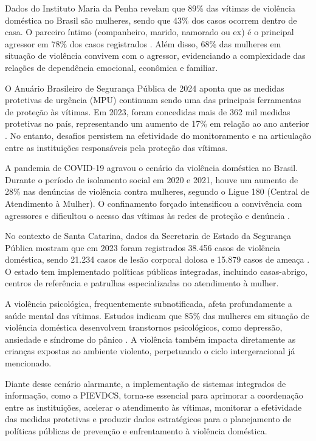 \par Dados do Instituto Maria da Penha revelam que 89\% das vítimas de violência doméstica no Brasil são mulheres, sendo que 43\% dos casos ocorrem dentro de casa. O parceiro íntimo (companheiro, marido, namorado ou ex) é o principal agressor em 78\% dos casos registrados \cite{imp2023}. Além disso, 68\% das mulheres em situação de violência convivem com o agressor, evidenciando a complexidade das relações de dependência emocional, econômica e familiar.

\par O Anuário Brasileiro de Segurança Pública de 2024 aponta que as medidas protetivas de urgência (MPU) continuam sendo uma das principais ferramentas de proteção às vítimas. Em 2023, foram concedidas mais de 362 mil medidas protetivas no país, representando um aumento de 17\% em relação ao ano anterior \cite{fbsp2024}. No entanto, desafios persistem na efetividade do monitoramento e na articulação entre as instituições responsáveis pela proteção das vítimas.

\par A pandemia de COVID-19 agravou o cenário da violência doméstica no Brasil. Durante o período de isolamento social em 2020 e 2021, houve um aumento de 28\% nas denúncias de violência contra mulheres, segundo o Ligue 180 (Central de Atendimento à Mulher). O confinamento forçado intensificou a convivência com agressores e dificultou o acesso das vítimas às redes de proteção e denúncia \cite{fbsp2021}.

\par No contexto de Santa Catarina, dados da Secretaria de Estado da Segurança Pública mostram que em 2023 foram registrados 38.456 casos de violência doméstica, sendo 21.234 casos de lesão corporal dolosa e 15.879 casos de ameaça \cite{ssp_sc2024}. O estado tem implementado políticas públicas integradas, incluindo casas-abrigo, centros de referência e patrulhas especializadas no atendimento à mulher.

\par A violência psicológica, frequentemente subnotificada, afeta profundamente a saúde mental das vítimas. Estudos indicam que 85\% das mulheres em situação de violência doméstica desenvolvem transtornos psicológicos, como depressão, ansiedade e síndrome do pânico \cite{zancan2013}. A violência também impacta diretamente as crianças expostas ao ambiente violento, perpetuando o ciclo intergeracional já mencionado.

\par Diante desse cenário alarmante, a implementação de sistemas integrados de informação, como a PIEVDCS, torna-se essencial para aprimorar a coordenação entre as instituições, acelerar o atendimento às vítimas, monitorar a efetividade das medidas protetivas e produzir dados estratégicos para o planejamento de políticas públicas de prevenção e enfrentamento à violência doméstica.

